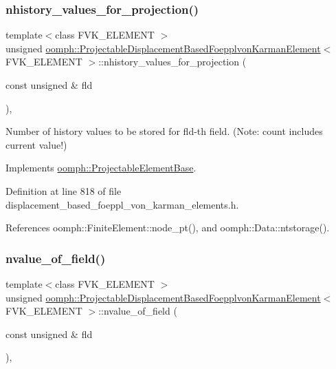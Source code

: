 \subsubsection{\texorpdfstring{nhistory\+\_\+values\+\_\+for\+\_\+projection()}{nhistory\_values\_for\_projection()}}
{\footnotesize\ttfamily template$<$class F\+V\+K\+\_\+\+E\+L\+E\+M\+E\+NT $>$ \\
unsigned \hyperlink{classoomph_1_1ProjectableDisplacementBasedFoepplvonKarmanElement}{oomph\+::\+Projectable\+Displacement\+Based\+Foepplvon\+Karman\+Element}$<$ F\+V\+K\+\_\+\+E\+L\+E\+M\+E\+NT $>$\+::nhistory\+\_\+values\+\_\+for\+\_\+projection (\begin{DoxyParamCaption}\item[{const unsigned \&}]{fld }\end{DoxyParamCaption})\hspace{0.3cm}{\ttfamily [inline]}, {\ttfamily [virtual]}}



Number of history values to be stored for fld-\/th field. (Note\+: count includes current value!) 



Implements \hyperlink{classoomph_1_1ProjectableElementBase_ac6790f394630b964663281f8740f43a5}{oomph\+::\+Projectable\+Element\+Base}.



Definition at line 818 of file displacement\+\_\+based\+\_\+foeppl\+\_\+von\+\_\+karman\+\_\+elements.\+h.



References oomph\+::\+Finite\+Element\+::node\+\_\+pt(), and oomph\+::\+Data\+::ntstorage().

\mbox{\label{classoomph_1_1ProjectableDisplacementBasedFoepplvonKarmanElement_aced5f16f95773d3dda606f3f21fc366e}} 
\subsubsection{\texorpdfstring{nvalue\+\_\+of\+\_\+field()}{nvalue\_of\_field()}}
{\footnotesize\ttfamily template$<$class F\+V\+K\+\_\+\+E\+L\+E\+M\+E\+NT $>$ \\
unsigned \hyperlink{classoomph_1_1ProjectableDisplacementBasedFoepplvonKarmanElement}{oomph\+::\+Projectable\+Displacement\+Based\+Foepplvon\+Karman\+Element}$<$ F\+V\+K\+\_\+\+E\+L\+E\+M\+E\+NT $>$\+::nvalue\+\_\+of\+\_\+field (\begin{DoxyParamCaption}\item[{const unsigned \&}]{fld }\end{DoxyParamCaption})\hspace{0.3cm}{\ttfamily [inline]}, {\ttfamily [virtual]}}



